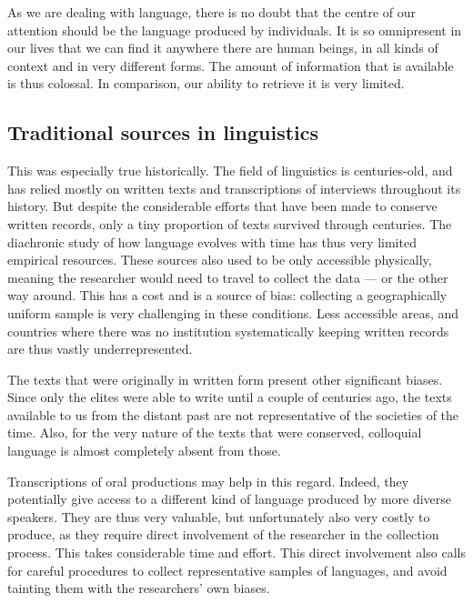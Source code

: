 \documentclass[../thesis.tex]{subfiles}
\begin{document}
As we are dealing with language, there is no doubt that the centre of our attention
should be the language produced by individuals. It is so omnipresent in our lives that
we can find it anywhere there are human beings, in all kinds of context and in very
different forms. The amount of information that is available is thus colossal. In
comparison, our ability to retrieve it is very limited.


\subsection{Traditional sources in linguistics}
This was especially true historically. The field of linguistics is centuries-old, and
has relied mostly on written texts and transcriptions of interviews throughout its
history. But despite the considerable efforts that have been made to conserve written records, only a tiny proportion of texts survived through
centuries. The diachronic study of how language evolves with time has thus very limited
empirical resources. These sources also used to be only accessible physically, meaning
the researcher would need to travel to collect the data --- or the other way around.
This has a cost and is a source of bias: collecting a geographically uniform
sample is very challenging in these conditions. Less accessible areas, and countries
where there was no institution systematically keeping written records are thus vastly
underrepresented.

The texts that were originally in written form present other significant biases. Since
only the elites were able to write until a couple of centuries ago, the texts available
to us from the distant past are not representative of the societies of the time. Also,
for the very nature of the texts that were conserved, colloquial language is almost
completely absent from those.

Transcriptions of oral productions may help in this regard. Indeed, they potentially
give access to a different kind of language produced by more diverse speakers. They are
thus very valuable, but unfortunately also very costly to produce, as they require
direct involvement of the researcher in the collection process. This takes considerable
time and effort. This direct involvement also calls for careful procedures to collect
representative samples of languages, and avoid tainting them with the researchers' own
biases. 
\end{document}
